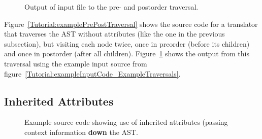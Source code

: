 \begin{figure}[!h]
{\indent
{\mySmallFontSize


\begin{latexonly}
   
\end{latexonly}

\begin{htmlonly}
   
\end{htmlonly}

}
}
\caption{Output of input file to the pre- and postorder traversal.}
\label{Tutorial:exampleOutput_PrePostTraversal}
\end{figure}

Figure~\ref{Tutorial:examplePrePostTraversal} shows the source code for a
translator that traverses the AST without attributes (like the one in the
previous subsection), but visiting each node twice, once in preorder (before
its children) and once in postorder (after all children).
Figure~\ref{Tutorial:exampleOutput_PrePostTraversal} shows the 
output from this traversal using the example input source from 
figure~\ref{Tutorial:exampleInputCode_ExampleTraversals}.


\subsection{Inherited Attributes}

\begin{figure}[!h]
{\indent
{\mySmallFontSize


\begin{latexonly}
   
\end{latexonly}

\begin{htmlonly}
   
\end{htmlonly}

}
}
\caption{Example source code showing use of inherited attributes (passing context
         information {\bf down} the AST.}
\label{Tutorial:exampleInheritedAttributeTraversal}
\end{figure}

